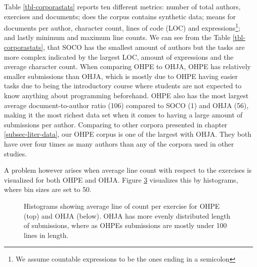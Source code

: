 \noindent
 Table \ref{tbl-corporastats} reports ten different metrics: number of total authors, exercises and documents; does the corpus contains synthetic data; means for documents per author, character count, lines of code (LOC) and expressions\footnote{We assume countable expressions to be the ones ending in a semicolon}; and lastly minimum and maximum line counts. We can see from the Table \ref{tbl-corporastats}, that SOCO has the smallest amount of authors but the tasks are more complex indicated by the largest LOC, amount of expressions and the average character count. When comparing OHPE to OHJA, OHPE has relatively smaller submissions than OHJA, which is mostly due to OHPE having easier tasks due to being the introductory course where students are not expected to know anything about programming beforehand. OHPE also has the most largest average document-to-author ratio (106) compared to SOCO (1) and OHJA (56), making it the most richest data set when it comes to having a large amount of submissions per author.  Comparing to other corpora presented in chapter \ref{subsec-liter-data}, our OHPE corpus is one of the largest with OHJA. They both have over four times as many authors than any of the corpora used in other studies.

A problem however arises when average line count with respect to the exercises is visualized for both OHPE and OHJA. Figure \ref{fig-hists} visualizes this by histograms, where bin sizes are set to 50. 


\begin{figure}[!h]
\centering
\captionsetup[subfigure]{justification=centering}

\begin{subfigure}{\textwidth}
    \setlength\figureheight{4cm}
    \setlength\figurewidth{\textwidth}
    
    \label{fig-ohpeavgloc}
\end{subfigure}

\begin{subfigure}{\textwidth}
  \setlength\figureheight{4cm}
    \setlength\figurewidth{\textwidth}
    
    \label{fig-ohjaavgloc}
\end{subfigure}

\caption[Two histograms for corpora]{Histograms showing average line of count per exercise for OHPE (top) and OHJA (below). OHJA has more evenly distributed length of submissions, where as OHPEs submissions are mostly under 100 lines in length.}
\label{fig-hists}
\end{figure}

